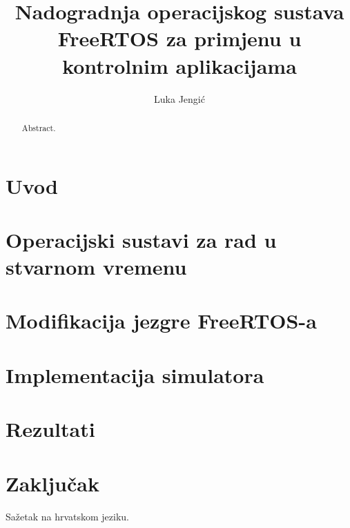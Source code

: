 \documentclass[times, utf8, zavrsni]{fer}
\begin{document}

\title{Nadogradnja operacijskog sustava FreeRTOS za primjenu u kontrolnim aplikacijama}

\author{Luka Jengić}

\maketitle


\renewcommand\contentsname{Sadržaj}
\tableofcontents

\chapter{Uvod} 


\chapter{Operacijski sustavi za rad u stvarnom vremenu}


\chapter{Modifikacija jezgre FreeRTOS-a}


\chapter{Implementacija simulatora}


\chapter{Rezultati}


\chapter{Zaključak}






\begin{sazetak}
Sažetak na hrvatskom jeziku.

\end{sazetak}

\begin{abstract}
Abstract.

\end{abstract}
\end{document}
